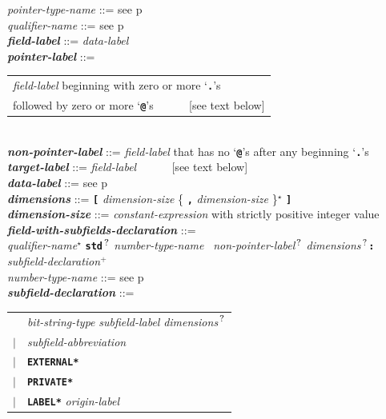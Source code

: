 \documentclass[12pt]{article}
\newcommand{\TT}[1]{{\tt \bfseries #1}}
\newcommand{\STAR}{{\Large $^\star$}}
\newcommand{\PLUS}[1][]{{$^{+#1}$}}
\newcommand{\QMARK}{{$^{\,\mbox{\footnotesize ?}}$}}
\newcommand{\ttkey}[1]{{\tt \bfseries #1}}
\newcommand{\emkey}[1]{{\em \bfseries #1}}
\newcommand{\pagref}[1]{p\pageref{#1}}
\newenvironment{indpar}[1][0.3in]%
	{\begin{list}{}%
		     {\setlength{\itemsep}{0in}%
		      \setlength{\topsep}{0in}%
		      \setlength{\parsep}{1ex}%
		      \setlength{\labelwidth}{#1}%
		      \setlength{\leftmargin}{#1}%
		      \addtolength{\leftmargin}{\labelsep}}%
	 \item}%
	{\end{list}}
\begin{document}
\begin{indpar}
{\em pointer-type-name} ::= see \pagref{POINTER-TYPE-NAME} \\
{\em qualifier-name} ::= see \pagref{QUALIFIER-NAME}
\\[2ex]
\emkey{field-label}\label{FIELD-LABEL} ::=  {\em data-label} \\
\emkey{pointer-label}\label{POINTER-LABEL} ::=
    \begin{tabular}[t]{@{}l}
    {\em field-label} beginning with zero or more `\TT{.}'s \\
    followed by zero or more `\TT{@}'s ~~~~~ [see text below] \\
    \end{tabular} \\
\emkey{non-pointer-label}\label{NON-POINTER-LABEL} ::=
    {\em field-label} that has no `\TT{@}'s after any beginning `\TT{.}'s \\
\emkey{target-label}\label{TARGET-LABEL} ::=  {\em field-label}
    ~~~~~ [see text below] \\
\emkey{data-label} ::=  see \pagref{DATA-LABEL}
\\[2ex]
\emkey{dimensions} ::=
    \TT{[} {\em dimension-size} \{ \TT{,} {\em dimension-size} \}\STAR{}
    \TT{]} \\
\emkey{dimension-size} ::=  {\em constant-expression}
			    with strictly positive integer value
\\[2ex]
\emkey{field-with-subfields-declaration} ::= \\
\hspace*{0.5in}
    {\em qualifier-name}\STAR{}
    \TT{std}\QMARK{} {\em number-type-name}~ {\em non-pointer-label}\QMARK{}
                {\em dimensions}\QMARK{}\TT{:} \\
\hspace*{1.0in}
    {\em subfield-declaration}\PLUS{} \\
{\em number-type-name} ::= see \pagref{NUMBER-TYPE-NAME}
\\[2ex]
\emkey{subfield-declaration}\label{SUBFIELD-DECLARATION} ::= \\
\hspace*{0.5in}\begin{tabular}[t]{rl}
	& {\em bit-string-type} {\em subfield-label}
    		{\em dimensions}\QMARK{} \\
    $|$ & {\em subfield-abbreviation} \\
    $|$ &  \ttkey{*EXTERNAL*} \\
    $|$ &  \ttkey{*PRIVATE*} \\
    $|$ &  \ttkey{*LABEL*} {\em origin-label} \\

\end{tabular}
\end{indpar}
\end{document}
